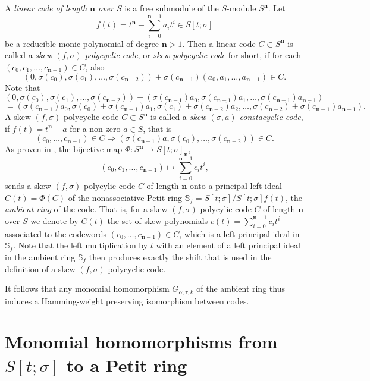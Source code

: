 \documentclass[11pt]{amsart}
\theoremstyle{plain}
\theoremstyle{definition}
\numberwithin{equation}{section}
\numberwithin{figure}{section}
\newcommand{\Sf}{\Stsigma/\Stsigma f(t)} %
\newcommand{\Stsigma}{S[t;\sigma]}
\newcommand{\de}{\mathbf{n}}  %
\begin{document}
 A \emph{linear code  of length $\mathbf{n}$ over $S$} is a  free submodule of the $S$-module $S^\mathbf{n}$.
Let $$f(t)=t^{\mathbf{n}}-\sum_{i=0}^{\mathbf{n}-1}a_it^i\in \Stsigma$$
be a reducible monic polynomial of degree $\mathbf{n}>1$.
 Then a linear code $C\subset S^{\mathbf{n}}$ is called a   \emph{skew  $(f,\sigma)$-polycyclic code}, or \emph{skew polycyclic code} for short, if for each   $(c_0,c_1,\ldots, c_{\mathbf{n}-1})\in C$,  also
$$
\left( 0, \sigma(c_0),\sigma(c_1),\ldots, \sigma(c_{\mathbf{n}-2})\right) + \sigma(c_{\mathbf{n}-1}) (a_0,a_1,\ldots, a_{\mathbf{n}-1}) \in C.
$$
Note that
$$
\left( 0, \sigma(c_0),\sigma(c_1),\ldots, \sigma(c_{\mathbf{n}-2})\right) +  (\sigma(c_{\mathbf{n}-1}) a_0,\sigma(c_{\mathbf{n}-1})a_1,\ldots, \sigma(c_{\mathbf{n}-1})a_{\mathbf{n}-1})$$
$$
  = ( \sigma(c_{\mathbf{n}-1}) a_0, \sigma(c_0)+\sigma(c_{\mathbf{n}-1})a_1,\sigma(c_1)+\sigma(c_{\mathbf{n}-2})a_2,\ldots, \sigma(c_{\mathbf{n}-2})+\sigma(c_{\mathbf{n}-1})a_{\mathbf{n}-1}).
$$
 A  skew  $(f,\sigma)$-polycyclic code $C\subset S^{\mathbf{n}}$ is called a
 \emph{skew  $(\sigma, a)$-constacyclic code}, if  $f(t)=t^{\mathbf{n}}-a$ for a non-zero $a\in S$, that is
   $$(c_0,\dots,c_{\mathbf{n}-1})\in  C\Rightarrow (\sigma(c_{\mathbf{n}-1})a,\sigma(c_0),\dots,\sigma(c_{\mathbf{n}-2}))\in  C.$$
   As proven in \cite{Pumpluen2025}, the bijective map $\Phi:S^{\mathbf{n}}\rightarrow \Stsigma_{\de}$,
$$(c_0,c_1,\dots,c_{\mathbf{n}-1})\mapsto \sum_{i=0}^{\mathbf{n}-1}c_it^i,$$ sends a skew $(f,\sigma)$-polycylic code $C$  of length $\mathbf{n}$ onto a principal  left ideal $C(t)=\Phi(C)$ of the nonassociative Petit ring $\mathbb{S}_f=\Sf$, the \emph{ambient ring} of the code.  That is, for a skew $(f,\sigma)$-polycylic code $C$  of length $\mathbf{n}$ over $S$ we denote by $C(t)$ the set of skew-polynomials
 $c(t)=\sum_{i=0}^{\mathbf{n}-1}c_it^i$ associated to the codewords $(c_0,\dots,c_{\mathbf{n}-1})\in C$, which is a left principal ideal in  $\mathbb{S}_f$. %
  Note that the left multiplication by $t$ with an element of a left principal ideal in the ambient ring $\mathbb{S}_f$  %
  then produces exactly the shift that is used in the definition of a skew $(f,\sigma)$-polycyclic code.

It follows that any monomial homomorphism $G_{\alpha,\tau,k}$ of the ambient ring thus induces a Hamming-weight preserving isomorphism between codes.


\section{Monomial homomorphisms from \texorpdfstring{$\Stsigma$}{STsigma} to a Petit ring} \label{S:3}
\end{document}
